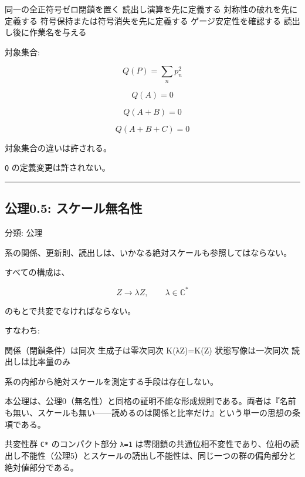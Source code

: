 \documentclass[
  a4paper,
]{ltjsarticle}
\newenvironment{Shaded}{}{}
\newcommand{\NormalTok}[1]{#1}
\begin{document}
\begin{Shaded}
\begin{Highlighting}[]
\NormalTok{同一の全正符号ゼロ閉鎖を置く}
\NormalTok{読出し演算を先に定義する}
\NormalTok{対称性の破れを先に定義する}
\NormalTok{符号保持または符号消失を先に定義する}
\NormalTok{ゲージ安定性を確認する}
\NormalTok{読出し後に作業名を与える}
\end{Highlighting}
\end{Shaded}

対象集合:

\[
Q(P)=\sum_n p_n^2
\]

\[
Q(A)=0
\]

\[
Q(A+B)=0
\]

\[
Q(A+B+C)=0
\]

対象集合の違いは許される。

\texttt{Q} の定義変更は許されない。

\begin{center}\rule{0.5\linewidth}{0.5pt}\end{center}

\subsection{公理0.5:
スケール無名性}\label{ux516cux74060.5-ux30b9ux30b1ux30fcux30ebux7121ux540dux6027}

分類: 公理

系の関係、更新則、読出しは、いかなる絶対スケールも参照してはならない。

すべての構成は、

\[
Z\to\lambda Z,\qquad\lambda\in\mathbb{C}^\ast
\]

のもとで共変でなければならない。

すなわち:

\begin{Shaded}
\begin{Highlighting}[]
\NormalTok{関係（閉鎖条件）は同次}
\NormalTok{生成子は零次同次 K(λZ)=K(Z)}
\NormalTok{状態写像は一次同次}
\NormalTok{読出しは比率量のみ}
\end{Highlighting}
\end{Shaded}

系の内部から絶対スケールを測定する手段は存在しない。

本公理は、公理0（無名性）と同格の証明不能な形成規則である。両者は『名前も無い、スケールも無い------読めるのは関係と比率だけ』という単一の思想の条項である。

共変性群 \texttt{C*} のコンパクト部分 \texttt{\textbar{}λ\textbar{}=1}
は零閉鎖の共通位相不変性であり、位相の読出し不能性（公理5）とスケールの読出し不能性は、同じ一つの群の偏角部分と絶対値部分である。
\end{document}
